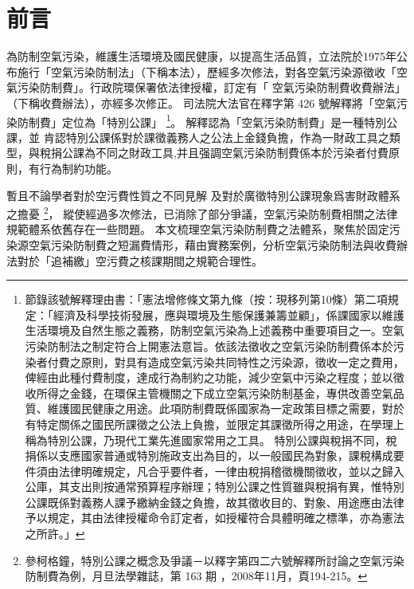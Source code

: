 
\section{前言}

為防制空氣污染，維護生活環境及國民健康，以提高生活品質，立法院於1975年公布施行「空氣污染防制法」（下稱本法），歷經多次修法，對各空氣污染源徵收「空氣污染防制費」。行政院環保署依法律授權，訂定有「	空氣污染防制費收費辦法」（下稱收費辦法），亦經多次修正。
司法院大法官在釋字第 426 號解釋將「空氣污染防制費」定位為「特別公課」
\footnote{節錄該號解釋理由書：「憲法增修條文第九條（按：現移列第10條）第二項規定：「經濟及科學技術發展，應與環境及生態保護兼籌並顧」，係課國家以維護生活環境及自然生態之義務，防制空氣污染為上述義務中重要項目之一。空氣污染防制法之制定符合上開憲法意旨。依該法徵收之空氣污染防制費係本於污染者付費之原則，對具有造成空氣污染共同特性之污染源，徵收一定之費用，俾經由此種付費制度，達成行為制約之功能，減少空氣中污染之程度；並以徵收所得之金錢，在環保主管機關之下成立空氣污染防制基金，專供改善空氣品質、維護國民健康之用途。此項防制費既係國家為一定政策目標之需要，對於有特定關係之國民所課徵之公法上負擔，並限定其課徵所得之用途，在學理上稱為特別公課，乃現代工業先進國家常用之工具。
特別公課與稅捐不同，稅捐係以支應國家普通或特別施政支出為目的，以一般國民為對象，課稅構成要件須由法律明確規定，凡合乎要件者，一律由稅捐稽徵機關徵收，並以之歸入公庫，其支出則按通常預算程序辦理；特別公課之性質雖與稅捐有異，惟特別公課既係對義務人課予繳納金錢之負擔，故其徵收目的、對象、用途應由法律予以規定，其由法律授權命令訂定者，如授權符合具體明確之標準，亦為憲法之所許。」}。
解釋認為「空氣污染防制費」是一種特別公課，並
肯認特別公課係對於課徵義務人之公法上金錢負擔，作為一財政工具之類型，與稅捐公課為不同之財政工具,并且强調空氣污染防制費係本於污染者付費原則，有行為制約功能。


暫且不論學者對於空污費性質之不同見解
及對於廣徵特別公課現象爲害財政體系之擔憂
\footnote{參柯格鐘，特別公課之概念及爭議－以釋字第四二六號解釋所討論之空氣污染防制費為例，月旦法學雜誌，第 163 期 ，2008年11月，頁194-215。}，
縱使經過多次修法，已消除了部分爭議，空氣污染防制費相關之法律規範體系依舊存在一些問題。
本文梳理空氣污染防制費之法體系，聚焦於固定污染源空氣污染防制費之短漏費情形，藉由實務案例，分析空氣污染防制法與收費辦法對於「追補繳」空污費之核課期間之規範合理性。


